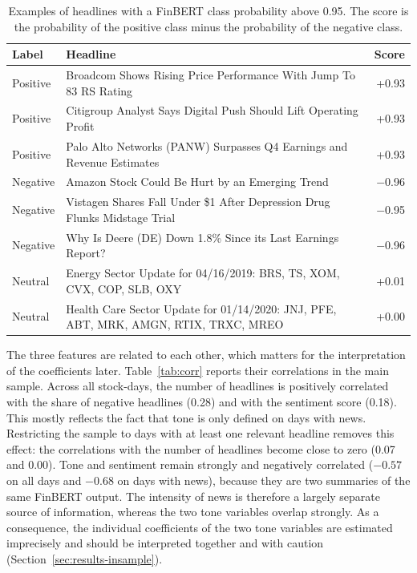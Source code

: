 \documentclass[12pt,a4paper]{article}
\begin{document}
\begin{table}[htbp]
  \centering\small
  \caption[Examples of FinBERT classifications]{Examples of headlines with a FinBERT class probability above 0.95. The score is the probability of the positive class minus the probability of the negative class.}
  \label{tab:examples}
  \begin{tabular}{lp{9.2cm}r}
    \toprule
    Label & Headline & Score \\
    \midrule
    Positive & Broadcom Shows Rising Price Performance With Jump To 83 RS Rating & +0.93 \\
    Positive & Citigroup Analyst Says Digital Push Should Lift Operating Profit & +0.93 \\
    Positive & Palo Alto Networks (PANW) Surpasses Q4 Earnings and Revenue Estimates & +0.93 \\
    Negative & Amazon Stock Could Be Hurt by an Emerging Trend & $-$0.96 \\
    Negative & Vistagen Shares Fall Under \$1 After Depression Drug Flunks Midstage Trial & $-$0.95 \\
    Negative & Why Is Deere (DE) Down 1.8\% Since its Last Earnings Report? & $-$0.96 \\
    Neutral & Energy Sector Update for 04/16/2019: BRS, TS, XOM, CVX, COP, SLB, OXY & +0.01 \\
    Neutral & Health Care Sector Update for 01/14/2020: JNJ, PFE, ABT, MRK, AMGN, RTIX, TRXC, MREO & +0.00 \\
    \bottomrule
  \end{tabular}
\end{table}

The three features are related to each other, which matters for the interpretation of the coefficients later. Table~\ref{tab:corr} reports their correlations in the main sample. Across all stock-days, the number of headlines is positively correlated with the share of negative headlines (0.28) and with the sentiment score (0.18). This mostly reflects the fact that tone is only defined on days with news. Restricting the sample to days with at least one relevant headline removes this effect: the correlations with the number of headlines become close to zero (0.07 and 0.00). Tone and sentiment remain strongly and negatively correlated ($-0.57$ on all days and $-0.68$ on days with news), because they are two summaries of the same FinBERT output. The intensity of news is therefore a largely separate source of information, whereas the two tone variables overlap strongly. As a consequence, the individual coefficients of the two tone variables are estimated imprecisely and should be interpreted together and with caution (Section~\ref{sec:results-insample}).
\end{document}
